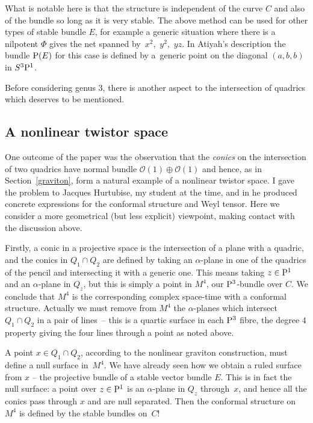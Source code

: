 \documentclass[pdftex]{sigma}
\numberwithin{equation}{section}
\begin{document}
\begin{Remark} What is notable here is that the structure is independent of the curve $C$ and also of the bundle so long as it is very stable. The above method
can be used for other types of stable bundle $E$, for example a generic situation where there is a nilpotent $\Phi$ gives the net spanned by~$x^2$,~$y^2$,~$yz$. In Atiyah's description the bundle ${\rm P}(E)$ for this case is defined by a~generic point on the diagonal $(a,b,b)$ in $S^3{\rm P}^1$.
\end{Remark}

Before considering genus $3$, there is another aspect to the intersection of quadrics which deserves to be mentioned.

\subsection{A nonlinear twistor space}
One outcome of the paper \cite{Hitchin1981} was the observation that the {\it conics} on the intersection of two quadrics have normal bundle $\mathcal{O}(1)\oplus \mathcal{O}(1)$ and hence, as in Section~\ref{graviton}, form a natural example of a nonlinear twistor space. I gave the problem to Jacques Hurtubise, my student at the time, and in \cite{Hurtubise} he produced concrete expressions for the conformal structure and Weyl tensor. Here we consider a more geometrical (but less explicit) viewpoint, making contact with the discussion above.

Firstly, a conic in a projective space is the intersection of a plane with a quadric, and the conics in $Q_1\cap Q_2$ are defined by taking an $\alpha$-plane in one of the quadrics of the pencil and intersecting it with a generic one. This means taking $z\in {\rm P}^1$ and an $\alpha$-plane in $Q_z$, but this is simply a point in $M^4$, our ${\rm P}^3$-bundle over $C$. We conclude that $M^4$ is the corresponding complex space-time with a conformal structure. Actually we must remove from $M^4$ the $\alpha$-planes which intersect $Q_1\cap Q_2$ in a pair of lines~-- this is a quartic surface in each ${\rm P}^3$ fibre, the degree $4$ property giving the four lines through a point as noted above.

A point $x\in Q_1\cap Q_2$, according to the nonlinear graviton construction, must define a null surface in~$M^4$. We have already seen how we obtain a ruled surface from $x$ -- the projective bundle of a stable vector bundle $E$. This is in fact the null surface: a point over $z\in {\rm P}^1$ is an $\alpha$-plane in $Q_z$ through~$x$, and hence all the conics pass through $x$ and are null separated. Then the conformal structure on $M^4$ is defined by the stable bundles on~$C$!
\end{document}
